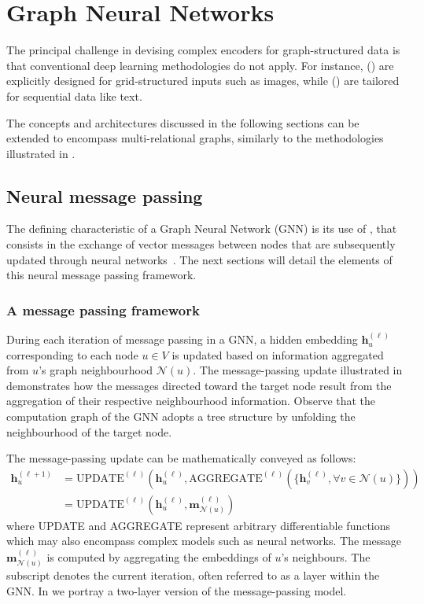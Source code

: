 \section{Graph Neural Networks}\label{sec:gnn}
The principal challenge in devising complex encoders for graph-structured data is that conventional deep learning methodologies do not apply. For instance,  () are explicitly designed for grid-structured inputs such as images, while  () are tailored for sequential data like text.

The concepts and architectures discussed in the following sections can be extended to encompass multi-relational graphs, similarly to the methodologies illustrated in .

\subsection{Neural message passing}
The defining characteristic of a Graph Neural Network (GNN) is its use of , that consists in the exchange of vector messages between nodes that are subsequently updated through neural networks~\cite{Gilmer2017neuralMessagePassing}. The next sections will detail the elements of this neural message passing framework.

\subsubsection{A message passing framework}\label{sec:messagePassingFramework}
During each iteration of message passing in a GNN, a hidden embedding $ \mathbf{h}_u^{(\ell)} $ corresponding to each node $ u \in V $ is updated based on information aggregated from $ u $’s graph neighbourhood $ \mathcal{N}(u) $. The message-passing update illustrated in  demonstrates how the messages directed toward the target node result from the aggregation of their respective neighbourhood information. Observe that the computation graph of the GNN adopts a tree structure by unfolding the neighbourhood of the target node.



The message-passing update can be mathematically conveyed as follows:
\begin{align}\label{eq:GNNupdate}
    \mathbf{h}_u^{(\ell+1)} &= \text{UPDATE}^{(\ell)}\left(\mathbf{h}_u^{(\ell)}, \text{AGGREGATE}^{(\ell)}(\{\mathbf{h}_v^{(\ell)}, \forall v \in \mathcal{N}(u)\})\right) \\
    &= \text{UPDATE}^{(\ell)}\left(\mathbf{h}_u^{(\ell)}, \mathbf{m}_{\mathcal{N}(u)}^{(\ell)}\right)
\end{align}
where UPDATE and AGGREGATE represent arbitrary differentiable functions which may also encompass complex models such as neural networks. The message $ \mathbf{m}_{\mathcal{N}(u)}^{(\ell)} $ is computed by aggregating the embeddings of $ u $'s neighbours. The subscript denotes the current iteration, often referred to as a layer within the GNN. In  we portray a two-layer version of the message-passing model.


